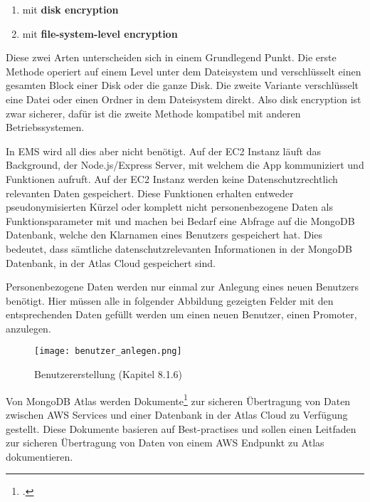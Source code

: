 \begin{enumerate}
	\item mit \textbf{disk encryption}
	\item mit \textbf{file-system-level encryption}
\end{enumerate}

Diese zwei Arten unterscheiden sich in einem Grundlegend Punkt. Die erste Methode operiert auf einem Level unter dem Dateisystem und verschlüsselt einen gesamten Block einer Disk oder die ganze Disk. Die zweite Variante
verschlüsselt eine Datei oder einen Ordner in dem Dateisystem direkt. Also disk encryption ist zwar sicherer, dafür ist die zweite Methode kompatibel mit anderen Betriebssystemen.

In EMS wird all dies aber nicht benötigt. Auf der EC2 Instanz läuft das Background, der Node.js/Express Server, mit welchem die App kommuniziert und Funktionen aufruft. Auf der EC2 Instanz werden keine Datenschutzrechtlich
relevanten Daten gespeichert. Diese Funktionen erhalten entweder pseudonymisierten Kürzel oder komplett nicht personenbezogene Daten als Funktionsparameter mit und machen bei Bedarf eine Abfrage auf die MongoDB Datenbank,
welche den Klarnamen eines Benutzers gespeichert hat. Dies bedeutet, dass sämtliche datenschutzrelevanten Informationen in der MongoDB Datenbank, in der Atlas Cloud gespeichert sind.

Personenbezogene Daten werden nur einmal zur Anlegung eines neuen Benutzers benötigt. Hier müssen alle in folgender Abbildung gezeigten Felder mit den entsprechenden Daten gefüllt werden um einen neuen Benutzer, einen Promoter, anzulegen.
\begin{center}
	\begin{figure}[h]
		\centering
		\texttt{[image: benutzer\_anlegen.png]}
		\caption{Benutzererstellung (Kapitel 8.1.6)}
	\end{figure}
\end{center}

Von MongoDB Atlas werden Dokumente\footcite{atlas-doku-aws} zur sicheren Übertragung von Daten zwischen AWS Services und einer Datenbank in der Atlas Cloud zu Verfügung gestellt. Diese Dokumente basieren auf Best-practises und sollen einen Leitfaden zur
sicheren Übertragung von Daten von einem AWS Endpunkt zu Atlas dokumentieren.

